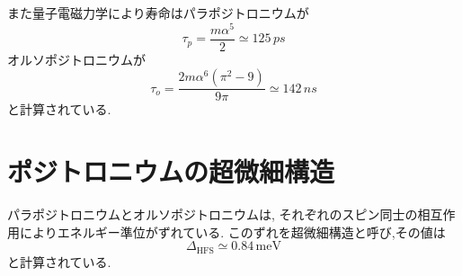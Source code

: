 また量子電磁力学により寿命はパラポジトロニウムが
\begin{equation}
	\nonumber
\tau_{p} = \frac{m \alpha^{5}}{2} \simeq 125 \, \si{ps}
\end{equation}
オルソポジトロニウムが
\begin{equation}
	\nonumber
\tau_{o} = \frac{2m \alpha^{6}(\pi^{2}-9)}{9 \pi} \simeq 142 \, \si{ns}
\end{equation}
と計算されている.


\section{ポジトロニウムの超微細構造}

パラポジトロニウムとオルソポジトロニウムは,
それぞれのスピン同士の相互作用によりエネルギー準位がずれている.
このずれを超微細構造と呼び,その値は
\begin{equation}
	\nonumber
\Delta_{\mathrm{HFS}} \simeq 0.84 \, \mathrm{meV}
\end{equation}
と計算されている.


